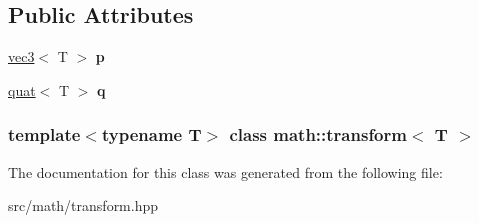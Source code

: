 \subsection*{Public Attributes}
\begin{DoxyCompactItemize}
\item 
\hypertarget{classmath_1_1transform_ae2c65f8049388220d23b3cc55e87151c}{
\hyperlink{classmath_1_1vec3}{vec3}$<$ T $>$ {\bfseries p}}
\label{classmath_1_1transform_ae2c65f8049388220d23b3cc55e87151c}

\item 
\hypertarget{classmath_1_1transform_a942996749f0d6f49ef2c594cb296fd16}{
\hyperlink{classmath_1_1quat}{quat}$<$ T $>$ {\bfseries q}}
\label{classmath_1_1transform_a942996749f0d6f49ef2c594cb296fd16}

\end{DoxyCompactItemize}
\subsubsection*{template$<$typename T$>$ class math::transform$<$ T $>$}



The documentation for this class was generated from the following file:\begin{DoxyCompactItemize}
\item 
src/math/transform.hpp\end{DoxyCompactItemize}
